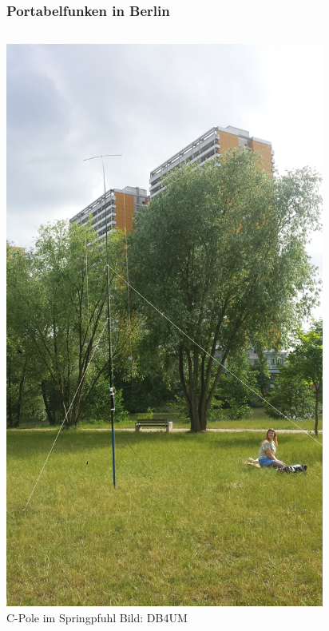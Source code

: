 \begin{frame}
  \frametitle{Portabelfunken in Berlin}
  \begin{columns}[c]
    \column[c]{5cm}
    \begin{center}
      \includegraphics[width=0.82\textwidth]{a09/db4um_dm1ri_portabel.jpg}\\
      \tiny C-Pole im Springpfuhl Bild: DB4UM
    \end{center}
    \column{5cm} \large
    \begin{center}

\end{center}
\end{columns}
\end{frame}
